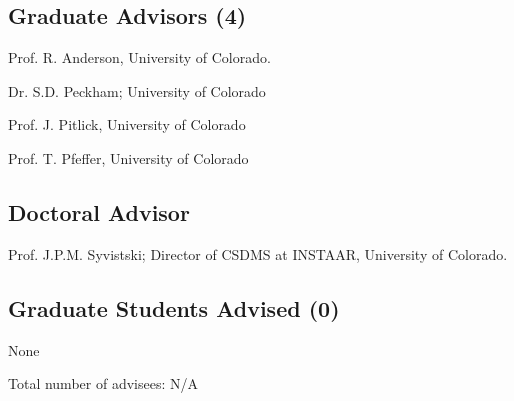 \documentclass[letterpaper]{resume}
\begin{document}
\subsection{Graduate Advisors (4)}
\begin{multicols}{2}
\begin{compactitem}[\itembullet]
  \item Prof. R. Anderson, University of Colorado.
  \item Dr. S.D. Peckham; University of Colorado
  \item Prof. J. Pitlick, University of Colorado
  \item Prof. T. Pfeffer, University of Colorado
\end{compactitem}
\end{multicols}

\subsection{Doctoral Advisor}
\begin{compactitem}[\itembullet]
  \item Prof. J.P.M. Syvistski; Director of CSDMS at INSTAAR, University of Colorado.
\end{compactitem}

\subsection{Graduate Students Advised (0)}
\begin{compactitem}[\itembullet]
  \item None
  \item Total number of advisees: N/A
\end{compactitem}

%

\nocite{}
\end{document}
